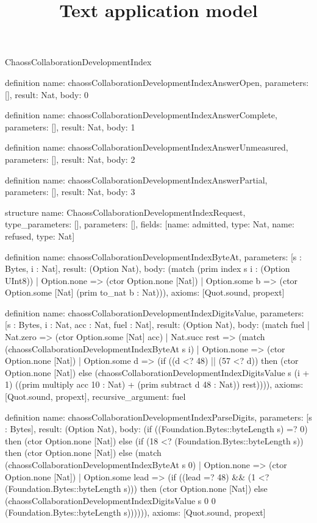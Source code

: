 \begin{lexlean}{ChaossCollaborationDevelopmentIndex}
\title{Text application model}
\begin{semanticmodule}
definition{
  name: chaossCollaborationDevelopmentIndexAnswerOpen,
  parameters: [],
  result: Nat,
  body: 0
}

definition{
  name: chaossCollaborationDevelopmentIndexAnswerComplete,
  parameters: [],
  result: Nat,
  body: 1
}

definition{
  name: chaossCollaborationDevelopmentIndexAnswerUnmeasured,
  parameters: [],
  result: Nat,
  body: 2
}

definition{
  name: chaossCollaborationDevelopmentIndexAnswerPartial,
  parameters: [],
  result: Nat,
  body: 3
}

structure{
  name: ChaossCollaborationDevelopmentIndexRequest,
  type_parameters: [],
  parameters: [],
  fields: [{name: admitted, type: Nat}, {name: refused, type: Nat}]
}

definition{
  name: chaossCollaborationDevelopmentIndexByteAt,
  parameters: [s : Bytes, i : Nat],
  result: (Option Nat),
  body: (match (prim index s i : (Option UInt8))
    | Option.none => (ctor Option.none [Nat])
    | Option.some b => (ctor Option.some [Nat] (prim to_nat b : Nat))),
  axioms: [Quot.sound, propext]
}

definition{
  name: chaossCollaborationDevelopmentIndexDigitsValue,
  parameters: [s : Bytes, i : Nat, acc : Nat, fuel : Nat],
  result: (Option Nat),
  body: (match fuel
    | Nat.zero => (ctor Option.some [Nat] acc)
    | Nat.succ rest => (match (chaossCollaborationDevelopmentIndexByteAt s i)
      | Option.none => (ctor Option.none [Nat])
      | Option.some d => (if ((d <? 48) || (57 <? d)) then (ctor Option.none [Nat]) else (chaossCollaborationDevelopmentIndexDigitsValue s (i + 1) ((prim multiply acc 10 : Nat) + (prim subtract d 48 : Nat)) rest)))),
  axioms: [Quot.sound, propext],
  recursive_argument: fuel
}

definition{
  name: chaossCollaborationDevelopmentIndexParseDigits,
  parameters: [s : Bytes],
  result: (Option Nat),
  body: (if ((Foundation.Bytes::byteLength s) =? 0) then (ctor Option.none [Nat]) else (if (18 <? (Foundation.Bytes::byteLength s)) then (ctor Option.none [Nat]) else (match (chaossCollaborationDevelopmentIndexByteAt s 0)
    | Option.none => (ctor Option.none [Nat])
    | Option.some lead => (if ((lead =? 48) && (1 <? (Foundation.Bytes::byteLength s))) then (ctor Option.none [Nat]) else (chaossCollaborationDevelopmentIndexDigitsValue s 0 0 (Foundation.Bytes::byteLength s)))))),
  axioms: [Quot.sound, propext]
}


\end{semanticmodule}
\end{lexlean}
